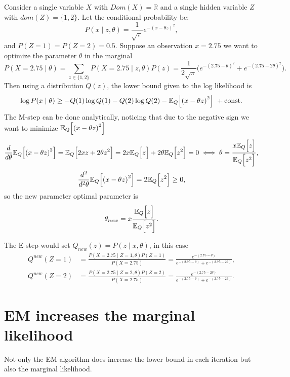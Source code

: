 \begin{exampleth}
  Consider a single variable \(X\) with \(Dom(X) = \mathbb{R}\) and a single hidden variable \(Z\) with \(dom(Z) = \{1,2\}\). Let the conditional probability be:
  \[
    P(x \mid z, \theta) = \frac{1}{\sqrt{\pi}}e^{{-(x - \theta z)}^{2}},
  \]
  and \(P(Z = 1) = P(Z = 2) = 0.5\). Suppose an observation \(x = 2.75\) we want to optimize the parameter \(\theta\) in the marginal
  \[
    P(X = 2.75 \mid \theta) = \sum_{z \in \{1,2\}} P(X = 2.75 \mid z, \theta) P(z) = \frac{1}{2\sqrt{\pi}}\big( e^{{-(2.75 - \theta)}^{2}} + e^{{-(2.75 - 2\theta)}^{2}} \big).
  \]
  Then using a distribution \(Q(z)\), the lower bound given to the log likelihood is
  \[
    \log{P(x \mid \theta)} \geq -Q(1)\log{Q(1)} - Q(2)\log{Q(2)} - \mathbb{E}_{Q}\Big[{(x - \theta z)}^{2}\Big]\ + \text{const.}
  \]
  The M-step can be done analytically, noticing that due to the negative sign we want to minimize \(\mathbb{E}_{Q}\Big[{(x - \theta z)}^{2}\Big]\)
  \[
    \frac{d}{d\theta}\mathbb{E}_{Q}\Big[{(x - \theta z)}^{2}\Big] = \mathbb{E}_{Q}\Big[ 2 x z + 2\theta z^{2} \Big] = 2x\mathbb{E}_{Q}\Big[z\Big] + 2\theta \mathbb{E}_{Q}\Big[z^{2}\Big] = 0 \iff \theta = \frac{x\mathbb{E}_{Q}\Big[z\Big]}{\mathbb{E}_{Q}\Big[z^{2}\Big]},
  \]
  \[
    \frac{d^{2}}{d^{2}\theta}\mathbb{E}_{Q}\Big[{(x - \theta z)}^{2}\Big] = 2\mathbb{E}_{Q}\Big[z^{2}\Big] \geq 0,
  \]
  so the new parameter optimal parameter is
  \[
    \theta_{new} = x \frac{\mathbb{E}_{Q}\Big[z\Big]}{\mathbb{E}_{Q}\Big[z^{2}\Big]}.
  \]

  The E-step would set \(Q_{new}(z) = P(z \mid x , \theta)\), in this case
  \[
    \begin{aligned}
      Q^{new}(Z = 1) &= \frac{P(X = 2.75 \mid Z = 1, \theta)P(Z = 1)}{P(X = 2.75)} = \frac{e^{-(2.75-\theta)}}{ e^{-(2.75-\theta)} + e^{-(2.75-2\theta)}  },\\
      Q^{new}(Z = 2) &= \frac{P(X = 2.75 \mid Z = 2, \theta)P(Z = 2)}{P(X = 2.75)} = \frac{e^{-(2.75-2\theta)}}{ e^{-(2.75-\theta)} + e^{-(2.75-2\theta)}  }.
    \end{aligned}
  \]
\end{exampleth}



\section{EM increases the marginal likelihood}

Not only the EM algorithm does increase the lower bound in each iteration but also the marginal likelihood.

